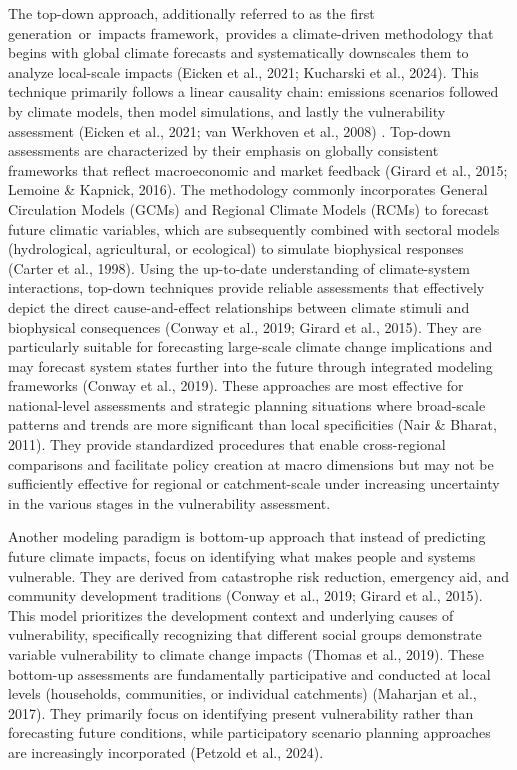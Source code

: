 \documentclass[
]{article}
\begin{document}
The top-down approach, additionally referred to as the first
generation~or~impacts framework,~provides a climate-driven methodology
that begins with global climate forecasts and systematically downscales
them to analyze local-scale impacts (Eicken et al., 2021; Kucharski et
al., 2024). This technique primarily follows a linear causality chain:
emissions scenarios followed by climate models, then model simulations,
and lastly the vulnerability assessment (Eicken et al., 2021; van
Werkhoven et al., 2008) . Top-down assessments are characterized by
their emphasis on globally consistent frameworks that reflect
macroeconomic and market feedback (Girard et al., 2015; Lemoine \&
Kapnick, 2016). The methodology commonly incorporates General
Circulation Models (GCMs) and Regional Climate Models (RCMs) to forecast
future climatic variables, which are subsequently combined with sectoral
models (hydrological, agricultural, or ecological) to simulate
biophysical responses (Carter et al., 1998). Using the up-to-date
understanding of climate-system interactions, top-down techniques
provide reliable assessments that effectively depict the direct
cause-and-effect relationships between climate stimuli and biophysical
consequences (Conway et al., 2019; Girard et al., 2015). They are
particularly suitable for forecasting large-scale climate change
implications and may forecast system states further into the future
through integrated modeling frameworks (Conway et al., 2019). These
approaches are most effective for national-level assessments and
strategic planning situations where broad-scale patterns and trends are
more significant than local specificities (Nair \& Bharat, 2011). They
provide standardized procedures that enable cross-regional comparisons
and facilitate policy creation at macro dimensions but may not be
sufficiently effective for regional or catchment-scale under increasing
uncertainty in the various stages in the vulnerability assessment.

Another modeling paradigm is bottom-up approach that instead of
predicting future climate impacts, focus on identifying what makes
people and systems vulnerable. They are derived from catastrophe risk
reduction, emergency aid, and community development traditions (Conway
et al., 2019; Girard et al., 2015). This model prioritizes the
development context and underlying causes of vulnerability, specifically
recognizing that different social groups demonstrate variable
vulnerability to climate change impacts (Thomas et al., 2019). These
bottom-up assessments are fundamentally participative and conducted at
local levels (households, communities, or individual catchments)
(Maharjan et al., 2017). They primarily focus on identifying present
vulnerability rather than forecasting future conditions, while
participatory scenario planning approaches are increasingly incorporated
(Petzold et al., 2024).
\end{document}
